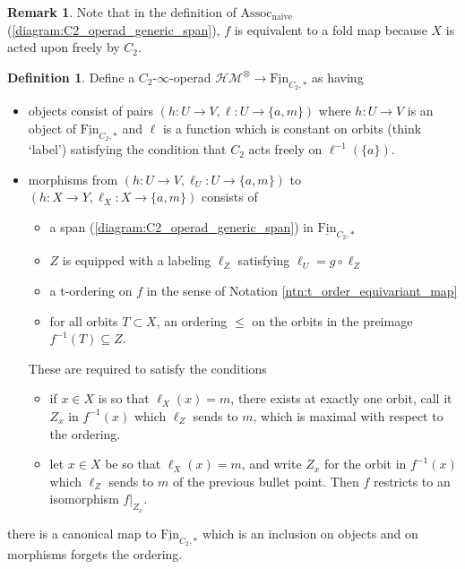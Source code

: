 \documentclass{article}
\theoremstyle{definition}
\newtheorem{definition}[equation]{Definition}
\newtheorem{remark}[equation]{Remark}
\begin{document}
\begin{remark}
    Note that in the definition of $ \mathrm{Assoc}_{\mathrm{naive}} $ (\ref{diagram:C2_operad_generic_span}), $ f $ is equivalent to a fold map because $ X $ is acted upon freely by $ C_2 $. 
\end{remark}
\begin{definition}\label{defn:hermitian_mod_param_operad}
    Define a $ C_2 $-$ \infty $-operad $ \mathcal{HM}^\otimes \to \underline{\mathrm{Fin}}_{C_2, *} $ as having 
    \begin{itemize}
        \item objects consist of pairs $ (h : U \to V, \ell \colon U \to \{a, m\}) $ where $ h: U \to V $ is an object of $ \underline{\mathrm{Fin}}_{C_2, *} $ and $ \ell $ is a function which is constant on orbits (think `label') satisfying the condition that $ C_2 $ acts freely on $ \ell^{-1}(\{a\}) $. 
        \item morphisms from $ (h : U \to V, \ell_U \colon U \to \{a, m\}) $ to $ (h : X \to Y, \ell_X \colon X \to \{a, m\}) $ consists of 
        \begin{itemize}
            \item a span (\ref{diagram:C2_operad_generic_span}) in $ \underline{\mathrm{Fin}}_{C_2, *} $
            \item $ Z $ is equipped with a labeling $ \ell_Z $ satisfying $ \ell_U = g \circ \ell_Z $ 
            \item a t-ordering on $ f $ in the sense of Notation \ref{ntn:t_order_equivariant_map}  
            \item for all orbits $ T \subset X $, an ordering $ \leq $ on the orbits in the preimage $ f^{-1}(T) \subseteq Z $. 
        \end{itemize} 
        These are required to satisfy the conditions 
        \begin{itemize}
            \item if $ x \in X $ is so that $ \ell_X(x) = m $, there exists at exactly one orbit, call it $ Z_x $ in $ f^{-1}(x) $ which $ \ell_Z $ sends to $ m $, which is maximal with respect to the ordering.  
            \item let $ x \in X $ be so that $ \ell_X(x) = m $, and write $ Z_x $ for the orbit in $ f^{-1}(x) $ which $ \ell_Z $ sends to $ m $ of the previous bullet point. Then $ f $ restricts to an isomorphism $ f|_{Z_x} $. %
        \end{itemize}
    \end{itemize}
    there is a canonical map to $ \underline{\mathrm{Fin}}_{C_2, *} $ which is an inclusion on objects and on morphisms forgets the ordering. 
\end{definition}
\end{document}
